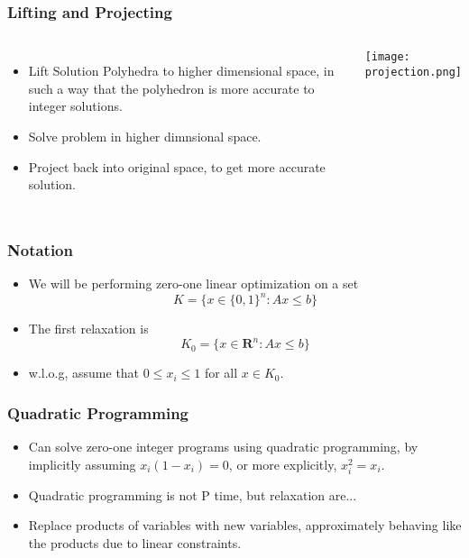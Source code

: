 \documentclass{beamer}
\begin{document}
\begin{frame}
    \frametitle{Lifting and Projecting}

    \begin{columns}

        \begin{itemize}
            \item Lift Solution Polyhedra to higher dimensional space, in such a way that the polyhedron is more accurate to integer solutions.
            \item Solve problem in higher dimnsional space.
            \item Project back into original space, to get more accurate solution.
        \end{itemize}

        \begin{center}
        \texttt{[image: projection.png]}
        \end{center}

    \end{columns}
\end{frame}

\begin{frame}
    \frametitle{Notation}

    \begin{itemize}
        \item We will be performing zero-one linear optimization on a set
        \[ K = \{ x \in \{ 0, 1 \}^n : Ax \leq b \} \]
        \item The first relaxation is
        \[ K_0 = \{ x \in \mathbf{R}^n : Ax \leq b \} \]
        \item w.l.o.g, assume that $0 \leq x_i \leq 1$ for all $x \in K_0$.
    \end{itemize}
\end{frame}

\begin{frame}
    \frametitle{Quadratic Programming}

    \begin{itemize}
        \item Can solve zero-one integer programs using quadratic programming, by implicitly assuming $x_i(1 - x_i) = 0$, or more explicitly, $x_i^2 = x_i$.
        \item Quadratic programming is not P time, but relaxation are...
        \item Replace products of variables with new variables, approximately behaving like the products due to linear constraints.
    \end{itemize}
\end{frame}
\end{document}
